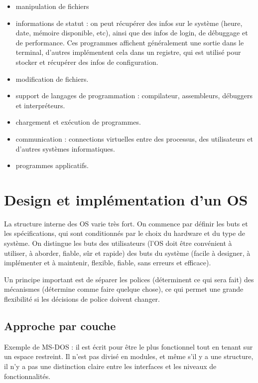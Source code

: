 \begin{itemize}
	\item manipulation de fichiers
	\item informations de statut : on peut récupérer des infos sur le système (heure, date, mémoire disponible, etc), ainsi que des infos de login, de débuggage et de performance. Ces programmes affichent généralement une sortie dans le terminal, d'autres implémentent cela dans un registre, qui est utilisé pour stocker et récupérer des infos de configuration.
	\item modification de fichiers.
	\item support de langages de programmation : compilateur, assembleurs, débuggers et interpréteurs.
	\item chargement et exécution de programmes.
	\item communication  : connections virtuelles entre des processus, des utilisateurs et d'autres systèmes informatiques.
	\item programmes applicatifs.
\end{itemize}


\section{Design et implémentation d'un OS}

La structure interne des OS varie très fort. On commence par définir les buts et les spécifications, qui sont conditionnés par le choix du hardware et du type de système. On distingue les buts des utilisateurs (l'OS doit être convénient à utiliser, à aborder, fiable, sûr et rapide) des buts du système (facile à designer, à implémenter et à maintenir, flexible, fiable, sans erreurs et efficace).

Un principe important est de séparer les polices (déterminent ce qui sera fait) des mécanismes (détermine comme faire quelque chose), ce qui permet une grande flexibilité si les décisions de police doivent changer.

	\subsection{Approche par couche}
	
	Exemple de MS-DOS : il est écrit pour être le plus fonctionnel tout en tenant sur un espace restreint. Il n'est pas divisé en modules, et même s'il y a une structure, il n'y a pas une distinction claire entre les interfaces et les niveaux de fonctionnalités.
	
